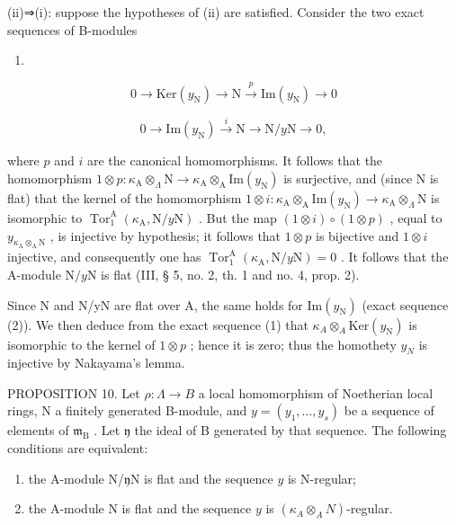 (ii)⇒(i): suppose the hypotheses of (ii) are satisfied. Consider the two exact sequences of B-modules

\begin{enumerate}
\def\labelenumi{(\arabic{enumi})}
\tightlist
\item
\end{enumerate}

\[
0 \to \mathrm{Ker} (y _ {\mathrm{N}}) \longrightarrow \mathrm{N} \stackrel {p} {\longrightarrow} \mathrm{Im} (y _ {\mathrm{N}}) \to 0\tag{1}
\]

\[
0 \to \mathrm{Im} (y _ {\mathrm{N}}) \stackrel {i} {\longrightarrow} \mathrm{N} \longrightarrow \mathrm{N} / y \mathrm{N} \to 0,\tag{2}
\]

where \(p\) and \(i\) are the canonical homomorphisms. It follows that the homomorphism \(1 \otimes p : \kappa_{\mathrm{A}} \otimes_{\Lambda} \mathrm{N} \longrightarrow \kappa_{\mathrm{A}} \otimes_{\mathrm{A}} \mathrm{Im}(y_{\mathrm{N}})\) is surjective, and (since N is flat) that the kernel of the homomorphism \(1 \otimes i : \kappa_{\mathrm{A}} \otimes_{\mathrm{A}} \mathrm{Im}(y_{\mathrm{N}}) \longrightarrow \kappa_{\mathrm{A}} \otimes_{\Lambda} \mathrm{N}\) is isomorphic to \(\operatorname{Tor}_1^{\mathrm{A}}(\kappa_{\mathrm{A}}, \mathrm{N}/y\mathrm{N})\) . But the map \((1 \otimes i) \circ (1 \otimes p)\) , equal to \(y_{\kappa_{\mathrm{A}} \otimes_{\mathrm{A}} \mathrm{N}}\) , is injective by hypothesis; it follows that \(1 \otimes p\) is bijective and \(1 \otimes i\) injective, and consequently one has \(\operatorname{Tor}_1^{\mathrm{A}}(\kappa_{\mathrm{A}}, \mathrm{N}/y\mathrm{N}) = 0\) . It follows that the A-module \(\mathrm{N}/y\mathrm{N}\) is flat (III, § 5, no. 2, th. 1 and no. 4, prop. 2).

Since N and N/yN are flat over A, the same holds for \(\mathrm{Im}(y_{\mathrm{N}})\) (exact sequence (2)). We then deduce from the exact sequence (1) that \(\kappa_{A} \otimes_{A} \mathrm{Ker}(y_{\mathrm{N}})\) is isomorphic to the kernel of \(1 \otimes p\) ; hence it is zero; thus the homothety \(y_{N}\) is injective by Nakayama's lemma.

PROPOSITION 10. Let \(\rho: \Lambda \to B\) a local homomorphism of Noetherian local rings, N a finitely generated B-module, and \(y = (y_1, \ldots, y_s)\) be a sequence of elements of \(\mathfrak{m}_{\mathrm{B}}\) . Let \(\mathfrak{y}\) the ideal of B generated by that sequence. The following conditions are equivalent:

\begin{enumerate}
\def\labelenumi{(\roman{enumi})}
\item
  the A-module N/\(\mathfrak{y}\)N is flat and the sequence \(y\) is N-regular;
\item
  the A-module N is flat and the sequence \(y\) is \((\kappa_{A} \otimes_{A} N)\)-regular.
\end{enumerate}

